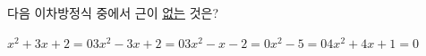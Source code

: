 다음 이차방정식 중에서 근이 \underline{없는} 것은?
\begin{choicesii}{$x^2+3x+2=0$}{$3x^2-3x+2=0$}{$3x^2-x-2=0$}{$x^2-5=0$}{$4x^2+4x+1=0$}\end{choicesii}
